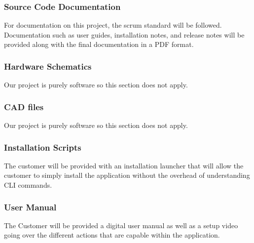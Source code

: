\subsubsection{Source Code Documentation}
For documentation on this project, the scrum standard will be followed. Documentation such as user guides, installation notes, and release notes will be provided along with the final documentation in a PDF format.

\subsubsection{Hardware Schematics}
Our project is purely software so this section does not apply.

\subsubsection{CAD files}
Our project is purely software so this section does not apply.

\subsubsection{Installation Scripts}

The customer will be provided with an installation launcher that will allow the customer to simply install the application without the overhead of understanding CLI commands.

\subsubsection{User Manual}
The Customer will be provided a digital user manual as well as a setup video going over the different actions that are capable within the application.
